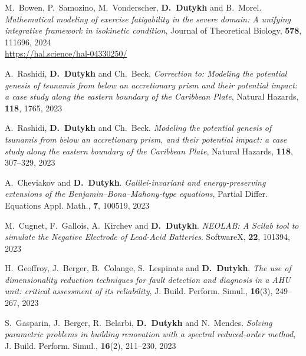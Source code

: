 \documentclass[final, a4paper, oneside, 12pt]{article}
\numberwithin{equation}{section}
\begin{document}
\begin{etaremune}
  \item M.~Bowen, P.~Samozino, M.~Vonderscher, \textbf{D.~Dutykh} and B.~Morel. \textit{Mathematical modeling of exercise fatigability in the severe domain: A unifying integrative framework in isokinetic condition}, Journal of Theoretical Biology, \textbf{578}, 111696, 2024 \\ %
  \url{https://hal.science/hal-04330250/}
  
  

  \item A.~Rashidi, \textbf{D.~Dutykh} and Ch.~Beck. \textit{Correction to: Modeling the potential genesis of tsunamis from below an accretionary prism and their potential impact: a case study along the eastern boundary of the Caribbean Plate}, Natural Hazards, \textbf{118}, 1765, 2023 %
  
  \item A.~Rashidi, \textbf{D.~Dutykh} and Ch.~Beck. \textit{Modeling the potential genesis of tsunamis from below an accretionary prism, and their potential impact: a case study along the eastern boundary of the Caribbean Plate}, Natural Hazards, \textbf{118}, 307--329, 2023 %

  \item A.~Cheviakov and \textbf{D.~Dutykh}. \textit{Galilei-invariant and energy-preserving extensions of the Benjamin--Bona--Mahony-type equations}, Partial Differ. Equations Appl. Math., \textbf{7}, 100519, 2023 %

  \item M.~Cugnet, F.~Gallois, A.~Kirchev and \textbf{D.~Dutykh}. \textit{NEOLAB: A Scilab tool to simulate the Negative Electrode of Lead-Acid Batteries}. SoftwareX, \textbf{22}, 101394, 2023 %
  
  \item H.~Geoffroy, J.~Berger, B.~Colange, S.~Lespinats and \textbf{D.~Dutykh}. \textit{The use of dimensionality reduction techniques for fault detection and diagnosis in a AHU unit: critical assessment of its reliability}, J. Build. Perform. Simul., \textbf{16}(3), 249--267, 2023 %

  \item S.~Gasparin, J.~Berger, R.~Belarbi, \textbf{D.~Dutykh} and N.~Mendes. \textit{Solving parametric problems in building renovation with a spectral reduced-order method}, J. Build. Perform. Simul., \textbf{16}(2), 211--230, 2023 %


\end{etaremune}
\end{document}
